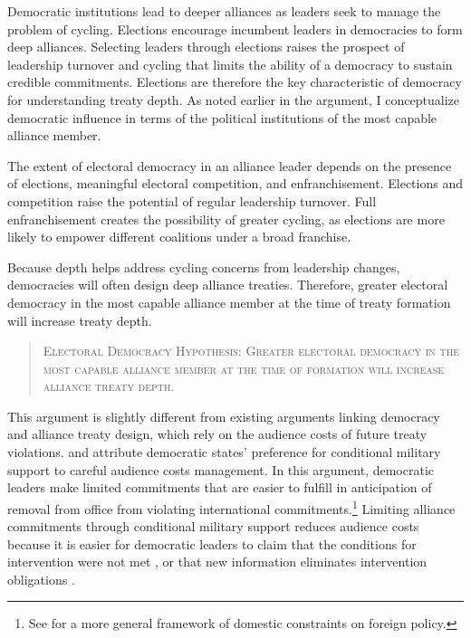 \documentclass[12pt]{article}
\begin{document}
Democratic institutions lead to deeper alliances as leaders seek to manage the problem of cycling. 
Elections encourage incumbent leaders in democracies to form deep alliances.
Selecting leaders through elections raises the prospect of leadership turnover and cycling that limits the ability of a democracy to sustain credible commitments. 
Elections are therefore the key characteristic of democracy for understanding treaty depth. 
As noted earlier in the argument, I conceptualize democratic influence in terms of the political institutions of the most capable alliance member.


The extent of electoral democracy in an alliance leader depends on the presence of elections, meaningful electoral competition, and enfranchisement. 
Elections and competition raise the potential of regular leadership turnover. 
Full enfranchisement creates the possibility of greater cycling, as elections are more likely to empower different coalitions under a broad franchise. 


Because depth helps address cycling concerns from leadership changes, democracies will often design deep alliance treaties. 
Therefore, greater electoral democracy in the most capable alliance member at the time of treaty formation will increase treaty depth. 


\begin{quote}
\textsc{Electoral Democracy Hypothesis: Greater electoral democracy in the most capable alliance member at the time of formation will increase alliance treaty depth.}
\end{quote}   


This argument is slightly different from existing arguments linking democracy and alliance treaty design, which rely on the audience costs of future treaty violations. 
\citet{Mattes2012} and \citet{Chibaetal2015} attribute democratic states' preference for conditional military support to careful audience costs management. 
In this argument, democratic leaders make limited commitments that are easier to fulfill in anticipation of removal from office from violating international commitments.\footnote{See \citet{HydeSaunders2020} for a more general framework of domestic constraints on foreign policy.} 
Limiting alliance commitments through conditional military support reduces audience costs because it is easier for democratic leaders to claim that the conditions for intervention were not met \citep{FjelstulReiter2019}, or that new information eliminates intervention obligations \citep{LevenduskyHorowitz2012}. 
\end{document}
